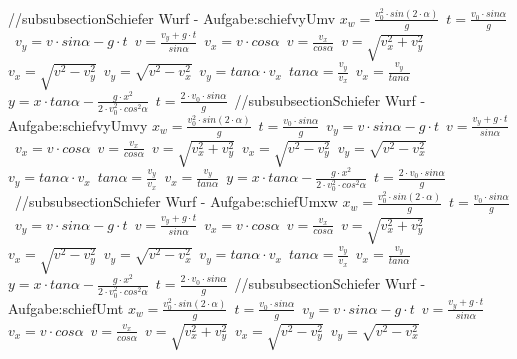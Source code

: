 //subsubsection{Schiefer Wurf  - Aufgabe:schiefvyUmv} 
$ x_{w}  = \frac{v_{0} ^{2} \cdot sin(2\cdot \alpha )}{       g} $\ 
$ t =\frac{v_{0} \cdot sin \alpha }{  g} $\ 
$ v_{y}  =  v\cdot sin\alpha - g\cdot t $\ 
$ v= \frac{ v_{y} +g\cdot t}{ sin\alpha } $\ 
$ v_{x}  = v\cdot  cos\alpha $\ 
$ v= \frac{ v_{x} }{ cos\alpha } $\ 
$ v= \sqrt{ v_{x} ^{2} + v_{y} ^{2} } $\ 
$ v_{x} = \sqrt{ v^{2}  - v_{y} ^{2} } $\ 
$ v_{y} = \sqrt{ v^{2}  - v_{x} ^{2} } $\ 
$ v_{y} = tan \alpha \cdot  v_{x} $\ 
$ tan \alpha = \frac{v_{y} }{v_{x} } $\ 
$ v_{x} = \frac{v_{y} }{tan \alpha } $\ 
$ y = x\cdot tan \alpha  - \frac{   g\cdot x^{2} }{2\cdot v^{2} _{0} \cdot cos ^{2}\alpha } $\ 
$ t =\frac{2\cdot v_{0} \cdot sin \alpha }{ g} $\ 
//subsubsection{Schiefer Wurf  - Aufgabe:schiefvyUmvy} 
$ x_{w}  = \frac{v_{0} ^{2} \cdot sin(2\cdot \alpha )}{       g} $\ 
$ t =\frac{v_{0} \cdot sin \alpha }{  g} $\ 
$ v_{y}  =  v\cdot sin\alpha - g\cdot t $\ 
$ v= \frac{ v_{y} +g\cdot t}{ sin\alpha } $\ 
$ v_{x}  = v\cdot  cos\alpha $\ 
$ v= \frac{ v_{x} }{ cos\alpha } $\ 
$ v= \sqrt{ v_{x} ^{2} + v_{y} ^{2} } $\ 
$ v_{x} = \sqrt{ v^{2}  - v_{y} ^{2} } $\ 
$ v_{y} = \sqrt{ v^{2}  - v_{x} ^{2} } $\ 
$ v_{y} = tan \alpha \cdot  v_{x} $\ 
$ tan \alpha = \frac{v_{y} }{v_{x} } $\ 
$ v_{x} = \frac{v_{y} }{tan \alpha } $\ 
$ y = x\cdot tan \alpha  - \frac{   g\cdot x^{2} }{2\cdot v^{2} _{0} \cdot cos ^{2}\alpha } $\ 
$ t =\frac{2\cdot v_{0} \cdot sin \alpha }{ g} $\ 
//subsubsection{Schiefer Wurf  - Aufgabe:schiefUmxw} 
$ x_{w}  = \frac{v_{0} ^{2} \cdot sin(2\cdot \alpha )}{       g} $\ 
$ t =\frac{v_{0} \cdot sin \alpha }{  g} $\ 
$ v_{y}  =  v\cdot sin\alpha - g\cdot t $\ 
$ v= \frac{ v_{y} +g\cdot t}{ sin\alpha } $\ 
$ v_{x}  = v\cdot  cos\alpha $\ 
$ v= \frac{ v_{x} }{ cos\alpha } $\ 
$ v= \sqrt{ v_{x} ^{2} + v_{y} ^{2} } $\ 
$ v_{x} = \sqrt{ v^{2}  - v_{y} ^{2} } $\ 
$ v_{y} = \sqrt{ v^{2}  - v_{x} ^{2} } $\ 
$ v_{y} = tan \alpha \cdot  v_{x} $\ 
$ tan \alpha = \frac{v_{y} }{v_{x} } $\ 
$ v_{x} = \frac{v_{y} }{tan \alpha } $\ 
$ y = x\cdot tan \alpha  - \frac{   g\cdot x^{2} }{2\cdot v^{2} _{0} \cdot cos ^{2}\alpha } $\ 
$ t =\frac{2\cdot v_{0} \cdot sin \alpha }{ g} $\ 
//subsubsection{Schiefer Wurf  - Aufgabe:schiefUmt} 
$ x_{w}  = \frac{v_{0} ^{2} \cdot sin(2\cdot \alpha )}{       g} $\ 
$ t =\frac{v_{0} \cdot sin \alpha }{  g} $\ 
$ v_{y}  =  v\cdot sin\alpha - g\cdot t $\ 
$ v= \frac{ v_{y} +g\cdot t}{ sin\alpha } $\ 
$ v_{x}  = v\cdot  cos\alpha $\ 
$ v= \frac{ v_{x} }{ cos\alpha } $\ 
$ v= \sqrt{ v_{x} ^{2} + v_{y} ^{2} } $\ 
$ v_{x} = \sqrt{ v^{2}  - v_{y} ^{2} } $\ 
$ v_{y} = \sqrt{ v^{2}  - v_{x} ^{2} } $\ 
